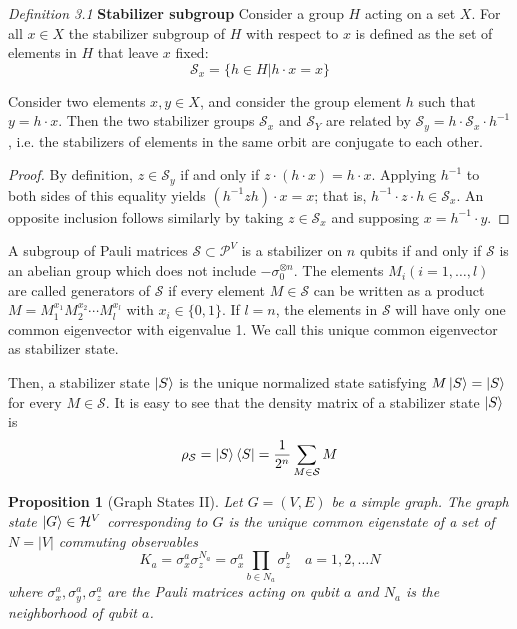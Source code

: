 \documentclass[10pt,a4paper]{book}
\numberwithin{equation}{chapter}
\numberwithin{figure}{chapter}
\numberwithin{table}{chapter}
\newtheorem{prop}{Proposition}[section]
\begin{document}
\textit{Definition 3.1} \textbf{Stabilizer subgroup} Consider a group $H$ acting on a set $X$. For all $x \in X$ the stabilizer subgroup of $H$ with respect to $x$ is defined as the set of elements in $H$ that leave $x$ fixed:
\begin{equation}
\mathcal{S}_x=\lbrace h\in H | h \cdot x =x \rbrace
\end{equation}

Consider two elements $ x, y \in X$, and consider the group element $h$ such that $y = h⋅x$. Then the two stabilizer groups $\mathcal{S}_x$ and $\mathcal{S}_Y$ are related by $\mathcal{S}_y = h \cdot \mathcal{S}_x \cdot h^{-1}$, i.e. the stabilizers of elements in the same orbit are conjugate to each other.

\begin{proof} By definition, $z \in \mathcal{S}_y$  if and only if $z\cdot(h\cdot x) = h\cdot x$. Applying $h^{-1}$ to both sides of this equality yields $(h^{-1}zh)\cdot x = x$; that is, $h^{-1}\cdot z\cdot h \in \mathcal{S}_x$. An opposite inclusion follows similarly by taking $z \in \mathcal{S}_x$ and supposing $x = h^{-1}\cdot y$.
\end{proof}  

A subgroup of Pauli matrices $\mathcal{S}\subset \mathcal{P}^V$ is a stabilizer on $n$ qubits if and only if $\mathcal{S}$ is an abelian group which does not include $-\sigma^{\otimes n}_0$. The elements $M_i(i = 1, \ldots ,l)$ are called generators of $\mathcal{S}$ if every element $M\in \mathcal{S}$ can be written as a product $M=M^{x_1}_1 M^{x_2}_2 \cdots M^{x_l}_l$ with $x_i \in \lbrace 0,1\rbrace$. If $l=n$, the elements in $\mathcal{S}$ will have only one common eigenvector with eigenvalue 1. We call this unique common eigenvector as stabilizer state. 

Then, a stabilizer state $\ket{S}$ is the unique normalized state satisfying $M\ket{S}=\ket{S}$ for every $M \in \mathcal{S}$. It is easy to see that the density matrix of a stabilizer state $\ket{S}$ is
\begin{equation}
\rho_{\mathcal{S}}=\ket{S}\bra{S}=\frac{1}{2^n}\sum_{M \in \mathcal{S}} M
\label{eq:stabilizer}
\end{equation} 


\begin{prop}[Graph States II]
Let $G=(V,E)$ be a simple graph. The graph state $\ket{G}\in \mathcal{H}^V$ corresponding to $G$ is the unique common eigenstate of a set of $N=|V|$ commuting observables
\begin{equation}
K_{a}=\sigma^{a}_{x}\sigma^{N_a}_{z}=\sigma^{a}_{x}\prod_{b\in N_a}\sigma^{b}_{z} \quad a=1,2,\ldots N
\end{equation}
where $\sigma^{a}_{x},\sigma^{a}_{y},\sigma^{a}_{z}$ are the Pauli matrices acting on qubit $a$ and $N_a$ is the neighborhood of qubit $a$.
\end{prop}
\end{document}
